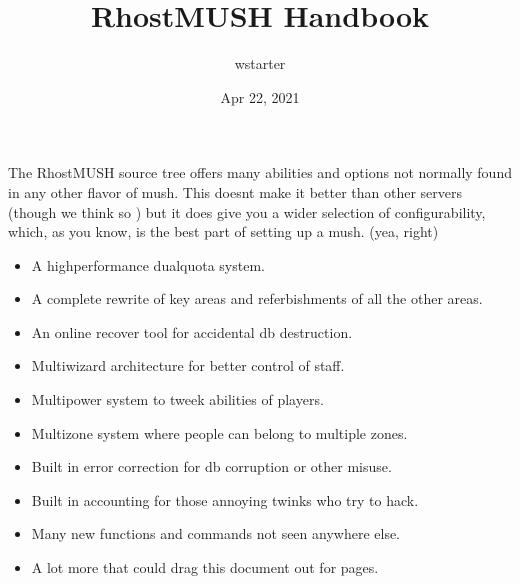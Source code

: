 \documentclass[letterpaper,10pt,english]{sphinxmanual}
\title{RhostMUSH Handbook}
\date{Apr 22, 2021}
\author{wstarter}
\begin{document}
\pagestyle{empty}
\sphinxmaketitle
\pagestyle{plain}
\sphinxtableofcontents
\pagestyle{normal}
\label{\detokenize{index::doc}}


\sphinxAtStartPar
The RhostMUSH source tree offers many abilities and options
not normally found in any other flavor of mush.  This doesn\textquotesingle{}t
make it better than other servers (though we think so )
but it does give you a wider selection of configurability,
which, as you know, is the best part of setting up a mush.
(yea, right)
\begin{itemize}
\item {} 
\sphinxAtStartPar
A high\sphinxhyphen{}performance dual\sphinxhyphen{}quota system.

\item {} 
\sphinxAtStartPar
A complete rewrite of key areas and referbishments of all the other areas.

\item {} 
\sphinxAtStartPar
An on\sphinxhyphen{}line recover tool for accidental db destruction.

\item {} 
\sphinxAtStartPar
Multi\sphinxhyphen{}wizard architecture for better control of staff.

\item {} 
\sphinxAtStartPar
Multi\sphinxhyphen{}power system to tweek abilities of players.

\item {} 
\sphinxAtStartPar
Multi\sphinxhyphen{}zone system where people can belong to multiple zones.

\item {} 
\sphinxAtStartPar
Built in error correction for db corruption or other misuse.

\item {} 
\sphinxAtStartPar
Built in accounting for those annoying twinks who try to hack.

\item {} 
\sphinxAtStartPar
Many new functions and commands not seen anywhere else.

\item {} 
\sphinxAtStartPar
A lot more that could drag this document out for pages.

\end{itemize}
\end{document}
